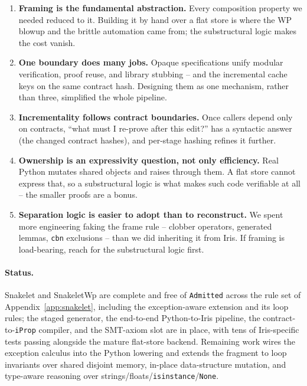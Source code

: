 \documentclass[sigconf,nonacm]{acmart}
\newcommand{\code}[1]{\texttt{#1}}
\begin{document}
\begin{enumerate}
  \item \textbf{Framing is the fundamental abstraction.} Every composition
  property we needed reduced to it. Building it by hand over a flat store is where
  the WP blowup and the brittle automation came from; the substructural logic
  makes the cost vanish.
  \item \textbf{One boundary does many jobs.} Opaque specifications unify modular
  verification, proof reuse, and library stubbing -- and the incremental cache
  keys on the same contract hash. Designing them as one mechanism, rather than
  three, simplified the whole pipeline.
  \item \textbf{Incrementality follows contract boundaries.} Once callers depend
  only on contracts, ``what must I re-prove after this edit?'' has a syntactic
  answer (the changed contract hashes), and per-stage hashing refines it further.
  \item \textbf{Ownership is an expressivity question, not only efficiency.} Real
  Python mutates shared objects and raises through them. A flat store cannot
  express that, so a substructural logic is what makes such code verifiable at
  all -- the smaller proofs are a bonus.
  \item \textbf{Separation logic is easier to adopt than to reconstruct.} We
  spent more engineering faking the frame rule -- clobber operators, generated
  lemmas, \code{cbn} exclusions -- than we did inheriting it from Iris. If
  framing is load-bearing, reach for the substructural logic first.
\end{enumerate}

\paragraph{Status.} Snakelet and SnakeletWp are complete and free of
\code{Admitted} across the rule set of Appendix~\ref{app:snakelet}, including the
exception-aware extension and its loop rules; the staged generator, the
end-to-end Python-to-Iris pipeline, the contract-to-\code{iProp} compiler, and
the SMT-axiom slot are in place, with tens of Iris-specific tests passing
alongside the mature flat-store backend. Remaining work wires the exception
calculus into the Python lowering and extends the fragment to loop invariants over
shared disjoint memory, in-place data-structure mutation, and type-aware
reasoning over strings\slash floats\slash\code{isinstance}\slash\code{None}.
\end{document}
